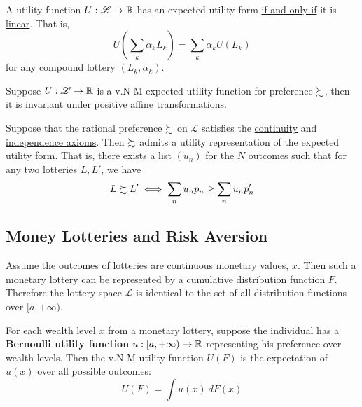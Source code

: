 \documentclass{report}
\begin{document}
	 		\begin{proposition}[6.B.1]
	 			A utility function $U: \mathscr{L} \to \mathbb{R}$ has an expected utility form \ul{if and only if} it is \ul{linear}. That is, 
	 			\begin{equation}
	 				U(\sum_k \alpha_k L_k) = \sum_k \alpha_k U(L_k)
	 			\end{equation}
	 			for any compound lottery $(L_k, \alpha_k)$.
	 		\end{proposition}
	 		
	 		\begin{proposition}[6.B.2]
	 			Suppose $U: \mathscr{L} \to \mathbb{R}$ is a v.N-M expected utility function for preference $\succsim$, then it is invariant under positive affine transformations.
	 		\end{proposition}
	 		
	 		\begin{proposition}
	 			Suppose that the rational preference $\succsim$ on $\mathscr{L}$ satisfies the \ul{continuity} and \ul{independence axioms}. Then $\succsim$ admits a utility representation of the expected utility form. That is, there exists a list $(u_n)$ for the $N$ outcomes such that for any two lotteries $L, L'$, we have
	 			\begin{equation}
	 				L \succsim L' \iff \sum_n u_n p_n \geq \sum_n u_n p_n'
	 			\end{equation}
	 		\end{proposition}
	 	
	 	\subsection{Money Lotteries and Risk Aversion}
	 		\begin{assumption}
	 			Assume the outcomes of lotteries are continuous monetary values, $x$. Then such a monetary lottery can be represented by a cumulative distribution function $F$. Therefore the lottery space $\mathscr{L}$ is identical to the set of all distribution functions over $[a, +\infty)$.
	 		\end{assumption}
	 		
	 		\begin{remark}
	 			For each wealth level $x$ from a monetary lottery, suppose the individual has a \textbf{Bernoulli utility function} $u: [a, +\infty) \to \mathbb{R}$ representing his preference over wealth levels. Then the v.N-M utility function $U(F)$ is the expectation of $u(x)$ over all possible outcomes:
	 			\begin{equation}
	 				U(F) = \int u(x)\ dF(x)
	 			\end{equation}
	 		\end{remark}
	 		
\end{document}
